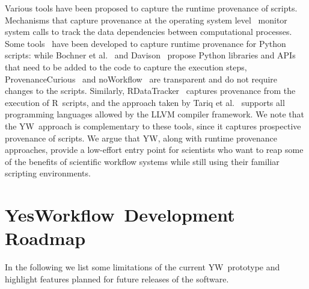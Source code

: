 \documentclass{article}
\newcommand{\YW}{\textsf{YesWorkflow}}
\newcommand{\yw}{\textsf{YW}}
\newcommand{\YWT}{\textsf{YesWorkflow}}
\newcommand{\ywm}[1]{\texttt{#1}}
\newcommand{\R}{\textsf{R}}
\begin{document}
Various tools have been proposed to capture the runtime provenance of
scripts. Mechanisms that capture provenance at the operating system
level~\cite{frew2008Automatic,guo2012BURRITO,muniswamy2006Provenance}
monitor system calls to track the data dependencies between
computational processes. Some
tools~\cite{bochner2008Python,davison2012Automated,huq2013ProvenanceCurious,murta2014noWorkflow}
have been developed to capture runtime provenance for Python scripts:
while Bochner et al.~\cite{bochner2008Python} and
Davison~\cite{davison2012Automated} propose Python libraries and APIs that
need to be added to the code to capture the execution steps,
ProvenanceCurious~\cite{huq2013ProvenanceCurious} and
noWorkflow~\cite{murta2014noWorkflow} are transparent and do not
require changes to the scripts. Similarly,
RDataTracker~\cite{Lerner2014RDataTracker} captures provenance from
the execution of \R\ scripts, and the approach taken by Tariq et
al.~\cite{Tariq2012Towards} supports all programming languages allowed
by the LLVM compiler framework. We note that the \yw\ approach is
complementary to these tools, since it captures prospective provenance
of scripts. We argue that \yw, along with runtime provenance
approaches, provide a low-effort entry point for scientists who want
to reap some of the benefits of scientific workflow systems while
still using their familiar scripting environments.


\section{\YWT\ Development Roadmap}\label{sec-conclusions}

In the following we list some limitations of the current \yw\
prototype and highlight features planned for future
releases of the software.

%
\end{document}
